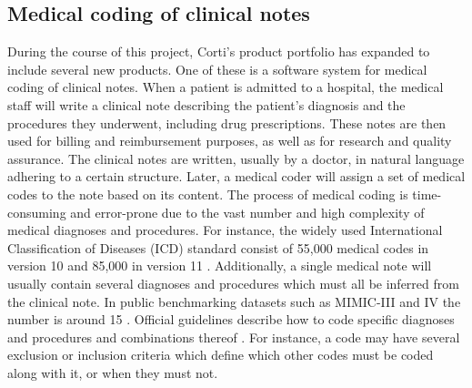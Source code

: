 \subsection{Medical coding of clinical notes}
%
During the course of this project, Corti's product portfolio has expanded to include several new products. 
One of these is a software system for medical coding of clinical notes. 
When a patient is admitted to a hospital, the medical staff will write a clinical note describing the patient's diagnosis and the procedures they underwent, including drug prescriptions. 
These notes are then used for billing and reimbursement purposes, as well as for research and quality assurance. 
The clinical notes are written, usually by a doctor, in natural language adhering to a certain structure. Later, a medical coder will assign a set of medical codes to the note based on its content. 
The process of medical coding is time-consuming and error-prone due to the vast number and high complexity of medical diagnoses and procedures. For instance, the widely used International Classification of Diseases (ICD) standard consist of 55,000 medical codes in version 10 and 85,000 in version 11 \cite{worldhealthorganisationwho_international_2023}. Additionally, a single medical note will usually contain several diagnoses and procedures which must all be inferred from the clinical note. In public benchmarking datasets such as MIMIC-III and IV the number is around 15 \cite{johnsonMIMICIIIFreelyAccessible2016,johnsonMIMICIVFreelyAccessible2023}. Official guidelines describe how to code specific diagnoses and procedures and combinations thereof \cite{centersformedicaremedicaidservicesus_icd10cm_2023}. 
For instance, a code may have several exclusion or inclusion criteria which define which other codes must be coded along with it, or when they must not. 

